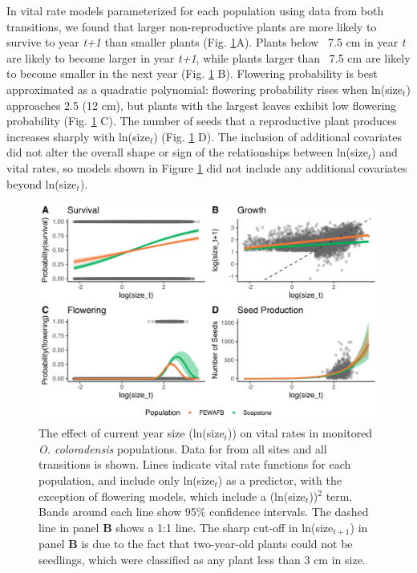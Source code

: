 \documentclass[12pt, letterpaper]{article}
\begin{document}
In vital rate models parameterized for each population using data from both transitions, we found that larger non-reproductive plants are more likely to survive to year \textit{t+1} than smaller plants (Fig. \ref{fig:vitalRates}A). Plants below ~7.5 cm in year \textit{t} are likely to become larger in year \textit{t+1}, while plants larger than ~7.5 cm are likely to become smaller in the next year (Fig. \ref{fig:vitalRates} B). Flowering probability is best approximated as a quadratic polynomial: flowering probability rises when ln(size$_t$) approaches 2.5 (12 cm), but plants with the largest leaves exhibit low flowering probability (Fig. \ref{fig:vitalRates} C). The number of seeds that a reproductive plant produces increases sharply with ln(size$_t$) (Fig. \ref{fig:vitalRates} D). The inclusion of additional covariates did not alter the overall shape or sign of the relationships between ln(size$_t$) and vital rates, so models shown in Figure \ref{fig:vitalRates} did not include any additional covariates beyond ln(size$_t$).  

\begin{figure}[h]
  \centering
  \includegraphics[width=\textwidth]{figures/VitalRateFigure.pdf}
  \caption{The effect of current year size (ln(size$_t$)) on vital rates in monitored \textit{O. coloradensis} populations. Data for from all sites and all transitions is shown. Lines indicate vital rate functions for each population, and include only ln(size$_t$) as a predictor, with the exception of flowering models, which include a (ln(size$_t$))$^2$ term. Bands around each line show 95\% confidence intervals. The dashed line in panel \textbf{B} shows a 1:1 line. The sharp cut-off in ln(size$_{t+1}$) in panel \textbf{B} is due to the fact that two-year-old plants could not be seedlings, which were classified as any plant less than 3 cm in size.}
  \label{fig:vitalRates}
\end{figure} 
\end{document}
